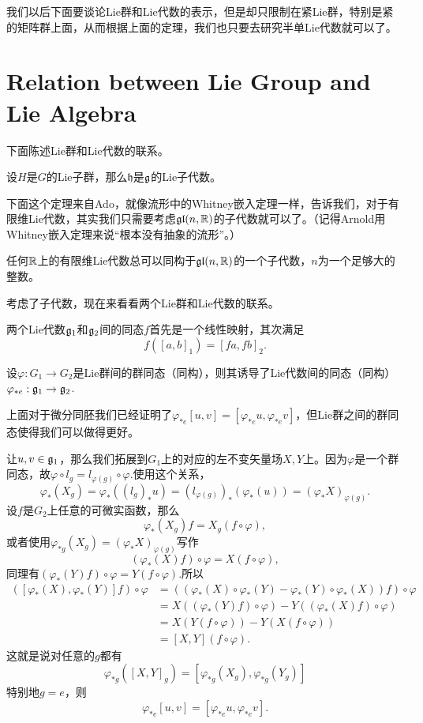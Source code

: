 我们以后下面要谈论Lie群和Lie代数的表示，但是却只限制在紧Lie群，特别是紧的矩阵群上面，从而根据上面的定理，我们也只要去研究半单Lie代数就可以了。

\section{Relation between Lie Group and Lie Algebra}

下面陈述Lie群和Lie代数的联系。

\theo 设$H$是$G$的Lie子群，那么$\mathfrak{h}$是${\mathfrak{g}}$的Lie子代数。

下面这个定理来自Ado，就像流形中的Whitney嵌入定理一样，告诉我们，对于有限维Lie代数，其实我们只需要考虑$\mathfrak{gl}(n,\mathbb{R})$的子代数就可以了。（记得Arnold用Whitney嵌入定理来说“根本没有抽象的流形”。）

\theo 任何$\mathbb{R}$上的有限维Lie代数总可以同构于$\mathfrak{gl}(n,\mathbb{R})$的一个子代数，$n$为一个足够大的整数。

考虑了子代数，现在来看看两个Lie群和Lie代数的联系。

\para 两个Lie代数${\mathfrak{g}}_1$和${\mathfrak{g}}_2$间的同态$f$首先是一个线性映射，其次满足
\[
f([a,b]_1)=[fa,fb]_2.
\]

\pro 设$\varphi:G_1\to G_2$是Lie群间的群同态（同构），则其诱导了Lie代数间的同态（同构）$\varphi_{*e}:{\mathfrak{g}}_1\to {\mathfrak{g}}_2$.

上面对于微分同胚我们已经证明了$\varphi_{*e}[u,v]=[\varphi_{*e}u,\varphi_{*e}v]$，但Lie群之间的群同态使得我们可以做得更好。

让$u,v\in{\mathfrak{g}}_1$，那么我们拓展到$G_1$上的对应的左不变矢量场$X,Y$上。因为$\varphi$是一个群同态，故$\varphi\circ l_g=l_{\varphi(g)}\circ \varphi$.使用这个关系，
\[
	\varphi_{*}(X_g)=\varphi_{*}((l_g)_*u)=(l_{\varphi(g)})_*(\varphi_{*}(u))=(\varphi_{*}X)_{\varphi(g)}.
\]
设$f$是$G_2$上任意的可微实函数，那么
\[
\varphi_{*}(X_g)f=X_g(f\circ \varphi),
\]
或者使用$\varphi_{*g}(X_g)=(\varphi_{*}X)_{\varphi(g)}$写作
\[
(\varphi_{*}(X)f)\circ \varphi=X(f\circ \varphi),
\]
同理有$(\varphi_{*}(Y)f)\circ \varphi=Y(f\circ \varphi)$.所以
\[
	\begin{split}
		([\varphi_*(X),\varphi_*(Y)]f)\circ \varphi&=((\varphi_*(X)\circ\varphi_*(Y)-\varphi_*(Y)\circ\varphi_*(X))f)\circ \varphi\\
		&=X((\varphi_*(Y)f)\circ \varphi)-Y((\varphi_*(X)f)\circ \varphi)\\
		&=X(Y(f\circ \varphi))-Y(X(f\circ \varphi))\\
		&=[X,Y](f\circ \varphi).
	\end{split}
\]
这就是说对任意的$g$都有
\[
	\varphi_{*g}([X,Y]_g)=[\varphi_{*g}(X_g),\varphi_{*g}(Y_g)]
\]
特别地$g=e$，则
\[
	\varphi_{*e}[u,v]=[\varphi_{*e}u,\varphi_{*e}v].
\]


